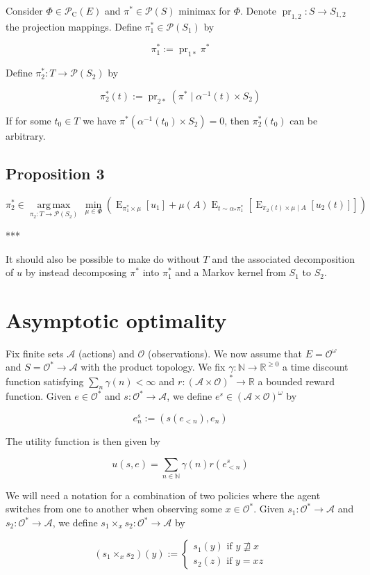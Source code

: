 \documentclass[a4paper]{article}
\DeclareMathOperator{\E}{E}
\DeclareMathOperator{\Prj}{pr}
\newcommand{\Argmax}[1]{\underset{#1}{\operatorname{arg\,max}}\,}
\newcommand{\Nats}{\mathbb{N}}
\newcommand{\Reals}{\mathbb{R}}
\newcommand{\Prob}{\mathcal{P}}
\newcommand{\Act}{\mathcal{A}}
\newcommand{\Obs}{\mathcal{O}}
\newcommand{\ObsO}{\Obs^\omega}
\newcommand{\Pol}{\Obs^* \rightarrow \Act}
\newcommand{\CC}{\mathcal{P}_{\operatorname{C}}}
\begin{document}
Consider ${\Phi \in \CC(E)}$ and ${\pi^* \in \Prob(S)}$ minimax for ${\Phi}$. Denote ${\Prj_{1,2}: S \rightarrow S_{1,2}}$ the projection mappings. Define ${\pi_1^* \in \Prob(S_1)}$ by

$$\pi_1^* := \Prj_{1*}\pi^*$$

Define ${\pi_2^*: T \rightarrow \Prob(S_2)}$ by

$$\pi_2^*(t) := \Prj_{2*} (\pi^* \mid \alpha^{-1}(t) \times S_2)$$

If for some ${t_0 \in T}$ we have ${\pi^*(\alpha^{-1}(t_0) \times S_2)=0}$, then ${\pi^*_2(t_0)}$ can be arbitrary.

\subsection{Proposition 3}

$$\pi_2^* \in \Argmax{\pi_2: T \rightarrow \Prob(S_2)} \min_{\mu \in \Phi} (\E_{\pi_1^* \times \mu}[u_1] + \mu(A) \E_{t \sim \alpha_*\pi_1^*}[\E_{\pi_2(t) \times \mu \mid A}[u_2(t)]])$$

***

It should also be possible to make do without ${T}$ and the associated decomposition of ${u}$ by instead decomposing ${\pi^*}$ into ${\pi_1^*}$ and a Markov kernel from ${S_1}$ to ${S_2}$.

\section{Asymptotic optimality}

Fix finite sets ${\Act}$ (actions) and ${\Obs}$ (observations). We now assume that ${E=\ObsO}$ and ${S=\Pol}$ with the product topology. We fix ${\gamma: \Nats \rightarrow \Reals^{\geq 0}}$ a time discount function satisfying ${\sum_n \gamma(n) < \infty}$ and ${r: (\Act \times \Obs)^* \rightarrow \Reals}$ a bounded reward function. Given ${e \in \Obs^*}$ and ${s: \Pol}$, we define ${e^s \in (\Act \times \Obs)^\omega}$ by

$${e^s_n:=(s(e_{<n}),e_n)}$$

The utility function is then given by

$$u(s,e)=\sum_{n \in \Nats} \gamma(n) r(e^s_{<n})$$

We will need a notation for a combination of two policies where the agent switches from one to another when observing some ${x \in \Obs^*}$. Given ${s_1: \Pol}$ and ${s_2: \Pol}$, we define ${s_1 \times_x s_2: \Pol}$ by

$$(s_1 \times_x s_2)(y):=\begin{cases}s_1(y) \text{ if } y \not\sqsupseteq x \\s_2(z) \text{ if } y=xz\end{cases}$$
\end{document}
